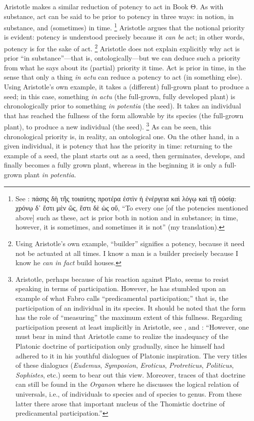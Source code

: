 Aristotle makes a similar reduction of potency to act in Book Θ. As with substance, act can be said to be prior to potency in three ways: in notion, in substance, and (sometimes) in time.%
%
\footnote{See \cite[Θ,~8, 1049b11–12]{aristotle:metaphysics}: πάσης δὴ τῆς τοιαύτης προτέρα ἐστὶν ἡ ἐνέργεια καὶ λόγῳ καὶ τῇ οὐσίᾳ: χρόνῳ δ᾽ ἔστι μὲν ὥς, ἔστι δὲ ὡς οὔ, “To every one [of the potencies mentioned above] such as these, act is prior both in notion and in substance; in time, however, it is sometimes, and sometimes it is not” (my translation).} Aristotle argues that the notional priority is evident: potency is understood precisely because it \emph{can be} act; in other words, potency is for the sake of act.%
%
\footnote{Using Aristotle’s own example, “builder” signifies a potency, because it need not be actuated at all times. I know a man is a builder precisely because I know he \emph{can in fact} build houses.}%
%
Aristotle does not explain explicitly why act is prior “in substance”—that is, ontologically—but we can deduce such a priority from what he says about its (partial) priority it time. Act is prior in time, in the sense that only a thing \emph{in actu} can reduce a potency to act (in something else). Using Aristotle’s own example, it takes a (different) full-grown plant to produce a seed; in this case, something \emph{in actu} (the full-grown, fully developed plant) is chronologically prior to something \emph{in potentia} (the seed). It takes an individual that has reached the fullness of the form allowable by its species (the full-grown plant), to produce a new individual (the seed).%
%
\footnote{Aristotle, perhaps because of his reaction against Plato, seems to resist speaking in terms of participation. However, he has stumbled upon an example of what Fabro calls “predicamental participation;” that is, the participation of an individual in its species. It should be noted that the form has the role of “measuring” the maximum extent of this fullness. Regarding participation present at least implicitly in Aristotle, see \cite[307–316]{fabro:partecipazione}, and \cite[456]{fabro:intensive}: “However, one must bear in mind that Aristotle came to realize the inadequacy of the Platonic doctrine of participation only gradually, since he himself had adhered to it in his youthful dialogues of Platonic inspiration. The very titles of these dialogucs (\emph{Eudemus}, \emph{Symposion}, \emph{Eroticus}, \emph{Protreticus}, \emph{Politicus}, \emph{Sophistes}, etc.) seem to bear out this view. Moreover, traces of that doctrine can still be found in the \emph{Organon} where he discusses the logical relation of universals, i.e., of individuals to species and of species to genus. From these latter there arose that important nucleus of the Thomistic doctrine of predicamental participation.”}
%
As can be seen, this chronological priority is, in reality, an ontological one. On the other hand, in a given individual, it is potency that has the priority in time: returning to the example of a seed, the plant starts out as a seed, then germinates, develops, and finally becomes a fully grown plant, whereas in the beginning it is only a full-grown plant \emph{in potentia}.

